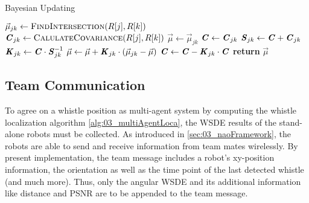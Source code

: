 \begin{algorithm}[H]
    \caption{Bayesian Updating}\label{alg:03_multiAgentLoca}
    \begin{algorithmic}[1]
                    \State $\vec{\mu}_{jk} \gets \Call{FindIntersection}{R[j], R[k]}$
                    \State $\textbf{\textit{C}}_{jk} \gets \Call{CalulateCovariance}{R[j], R[k]}$
                        \State $\vec{\mu} \gets \vec{\mu}_{jk}$
                        \State $\textbf{\textit{C}} \gets \textbf{\textit{C}}_{jk}$
                        \State $\textbf{\textit{S}}_{jk} \gets \textbf{\textit{C}} + \textbf{\textit{C}}_{jk}$
                        \State $\textbf{\textit{K}}_{jk} \gets \textbf{\textit{C}} \cdot \textbf{\textit{S}}_{jk}^{-1}$
                        \State $\vec{\mu} \gets \vec{\mu} + \textbf{\textit{K}}_{jk} \cdot (\vec{\mu}_{jk} - \vec{\mu})$
                        \State $\textbf{\textit{C}} \gets \textbf{\textit{C}} - \textbf{\textit{K}}_{jk} \cdot \textbf{\textit{C}}$
                    \EndIf
                \EndFor
            \EndFor
            \State \textbf{return} $\vec{\mu}$
        \EndProcedure\vspace{12pt}
    \end{algorithmic}
\end{algorithm}

\subsection{Team Communication}
\label{subsec:03_teamCommunication}

To agree on a whistle position as multi-agent system by computing the whistle
localization algorithm \cref{alg:03_multiAgentLoca}, the \ac{WSDE} results of the
stand-alone robots must be collected.
As introduced in \cref{sec:03_naoFramework}, the robots are able to send and receive
information from team mates wirelessly.
By present implementation, the team message includes a robot's xy-position information,
the orientation as well as the time point of the last detected whistle (and much more).
Thus, only the angular \ac{WSDE} and its additional information like distance and \ac{PSNR}
are to be appended to the team message.

